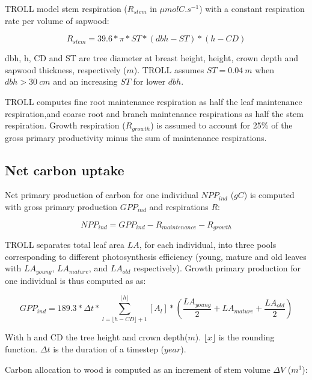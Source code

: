 \documentclass[12pt,]{article}
\theoremstyle{definition}
\theoremstyle{definition}
\theoremstyle{definition}
\theoremstyle{remark}
\begin{document}
TROLL model stem respiration (\(R_{stem}\) in \(\mu molC.s^{-1}\)) with
a constant respiration rate per volume of sapwood:

\begin{equation}
  R_{stem} = 39.6*\pi*ST*(dbh-ST)*(h-CD)
  \label{eq:Rs}
\end{equation}

dbh, h, CD and ST are tree diameter at breast height, height, crown
depth and sapwood thickness, respectively (\(m\)). TROLL assumes
\(ST=0.04~m\) when \(dbh>30~cm\) and an increasing \(ST\) for lower
\(dbh\).

TROLL computes fine root maintenance respiration as half the leaf
maintenance respiration,and coarse root and branch maintenance
respirations as half the stem respiration. Growth respiration
(\(R_{growth}\)) is assumed to account for 25\% of the gross primary
productivity minus the sum of maintenance respirations.

\subsection{Net carbon uptake}\label{net-carbon-uptake}

Net primary production of carbon for one individual \(NPP_{ind}\)
(\(gC\)) is computed with gross primary production \(GPP_{ind}\) and
respirations \(R\):

\begin{equation}
  NPP_{ind} = GPP_{ind} - R_{maintenance} - R_{growth}
  \label{eq:NPP}
\end{equation}

TROLL separates total leaf area \(LA\), for each individual, into three
pools corresponding to different photosynthesis efficiency (young,
mature and old leaves with \(LA_{young}\), \(LA_{mature}\), and
\(LA_{old}\) respectively). Growth primary production for one individual
is thus computed as as:

\begin{equation}
  GPP_{ind} = 189.3 * \Delta t * \sum _{l= \lfloor h-CD \rfloor +1} ^{\lfloor h \rfloor} [A_l] * (\frac{LA_{young}}{2} + LA_{mature} + \frac{LA_{old}}{2})
  \label{eq:GPP}
\end{equation}

With h and CD the tree height and crown depth(\(m\)).
\(\lfloor x \rfloor\) is the rounding function. \(\Delta t\) is the
duration of a timestep (\(year\)).

Carbon allocation to wood is computed as an increment of stem volume
\(\Delta V\) (\(m^3\)):
\end{document}
